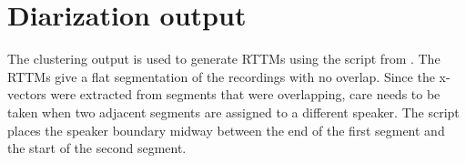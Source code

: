 \section{Diarization output}
The clustering output is used to generate RTTMs using the script  from . The RTTMs give a flat segmentation of the recordings with no overlap. Since the x-vectors were extracted from segments that were overlapping, care needs to be taken when two adjacent segments are assigned to a different speaker. The script places the speaker boundary midway between the end of the first segment and the start of the second segment.

